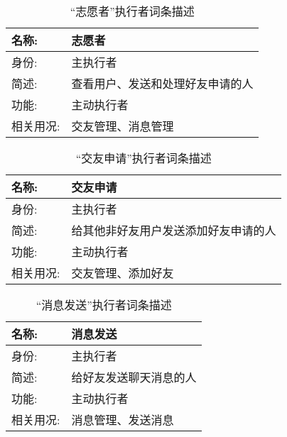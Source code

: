 
\begin{table}[H]  
\caption{“志愿者”执行者词条描述}  
\begin{center}  
    \begin{tabular}{l p{11cm}} 
        \hline
        \quad 名称:  &   志愿者 \\
        \hline
        \quad 身份:  & 主执行者 \\
        \hline
        \quad 简述:  & 查看用户、发送和处理好友申请的人 \\
        \hline
        \quad 功能:  & 主动执行者 \\
        \hline
        \quad 相关用况:  & 交友管理、消息管理 \\
        \hline
    \end{tabular}
\end{center}
\end{table}

\begin{table}[H]  
\caption{“交友申请”执行者词条描述}  
\begin{center}  
    \begin{tabular}{l p{11cm}} 
        \hline
        \quad 名称:  &   交友申请 \\
        \hline
        \quad 身份:  & 主执行者 \\
        \hline
        \quad 简述:  & 给其他非好友用户发送添加好友申请的人 \\
        \hline
        \quad 功能:  & 主动执行者 \\
        \hline
        \quad 相关用况:  & 交友管理、添加好友 \\
        \hline
    \end{tabular}
\end{center}
\end{table}

\begin{table}[H]  
\caption{“消息发送”执行者词条描述}  
\begin{center}  
    \begin{tabular}{l p{11cm}} 
        \hline
        \quad 名称:  &   消息发送 \\
        \hline
        \quad 身份:  & 主执行者 \\
        \hline
        \quad 简述:  & 给好友发送聊天消息的人 \\
        \hline
        \quad 功能:  & 主动执行者 \\
        \hline
        \quad 相关用况:  & 消息管理、发送消息 \\
        \hline
    \end{tabular}
\end{center}
\end{table}

